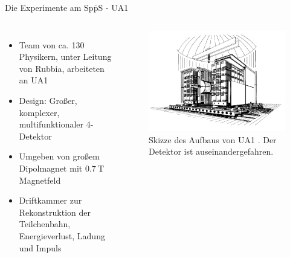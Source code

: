 \documentclass[aspectratio=1610, professionalfonts, 10pt]{beamer}
\begin{document}
\begin{frame}{Die Experimente am Sp$\overline{\text{p}}$S - UA1}
	\begin{columns}
				\begin{itemize}
					\setlength\itemsep{0.5em}
					\item Team von ca. 130 Physikern, unter Leitung von Rubbia, arbeiteten an UA1
					\item Design: Großer, komplexer, multifunktionaler 4\pi-Detektor
					\item Umgeben von großem Dipolmagnet mit $\SI{0.7}{\tesla}$ Magnetfeld
					\item Driftkammer zur Rekonstruktion der Teilchenbahn, Energieverlust, Ladung und Impuls
				\end{itemize}
			\begin{figure}
	  			\centering
				\includegraphics[width=\linewidth]{Images/Screenshot_2018-12-04_16-44-02.png}
				\caption{Skizze des Aufbaus von UA1 \cite{doi:10.1142/9789814644150_0006}. Der Detektor ist auseinandergefahren. }
	  			\label{fig:sad}
			\end{figure}
	\end{columns}
\end{frame}
\end{document}

